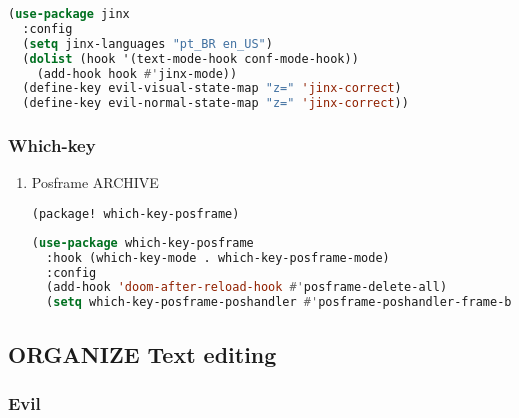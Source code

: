 \documentclass[11pt]{article}
\begin{document}
\begin{lstlisting}[language=Lisp]
(use-package jinx
  :config
  (setq jinx-languages "pt_BR en_US")
  (dolist (hook '(text-mode-hook conf-mode-hook))
    (add-hook hook #'jinx-mode))
  (define-key evil-visual-state-map "z=" 'jinx-correct)
  (define-key evil-normal-state-map "z=" 'jinx-correct))
\end{lstlisting}

\subsubsection{Which-key}
\label{sec:which-key}


\begin{enumerate}
  \item Posframe\hfill{} ARCHIVE
  \label{sec:posframe}

  \begin{lstlisting}[language=Lisp]
(package! which-key-posframe)
\end{lstlisting}

\begin{lstlisting}[language=Lisp]
(use-package which-key-posframe
  :hook (which-key-mode . which-key-posframe-mode)
  :config
  (add-hook 'doom-after-reload-hook #'posframe-delete-all)
  (setq which-key-posframe-poshandler #'posframe-poshandler-frame-bottom-center))
\end{lstlisting}
\end{enumerate}


\subsection{ORGANIZE Text editing}
\label{sec:organize-text-editing}


\subsubsection{Evil}
\label{sec:evil}
\end{document}
